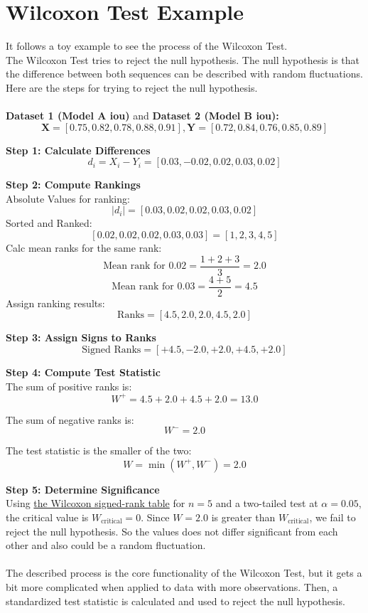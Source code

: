 \chapter{Wilcoxon Test Example}
\label{appendix:wilcoxon-test-example}
	It follows a toy example to see the process of the Wilcoxon Test.\\
	The Wilcoxon Test tries to reject the null hypothesis. The null hypothesis is that the difference between both sequences can be described with random fluctuations. Here are the steps for trying to reject the null hypothesis.\\
	\\
	\textbf{Dataset 1 (Model A \ac{iou})} and \textbf{Dataset 2 (Model B \ac{iou}):}
	\[
	\mathbf{X} = [0.75, 0.82, 0.78, 0.88, 0.91], \mathbf{Y} = [0.72, 0.84, 0.76, 0.85, 0.89]
	\]
	
	\textbf{Step 1: Calculate Differences}
	\[
	d_i = X_i - Y_i = [0.03, -0.02, 0.02, 0.03, 0.02]
	\]
	
	\textbf{Step 2: Compute Rankings}\\
	Absolute Values for ranking:
	\[
	|d_i| = [0.03, 0.02, 0.02, 0.03, 0.02]
	\]
	Sorted and Ranked:
	\[
	[0.02, 0.02, 0.02, 0.03, 0.03] = [1, 2, 3, 4, 5]
	\]
	Calc mean ranks for the same rank:
	\[
	\text{Mean rank for } 0.02 = \frac{1 + 2 + 3}{3} = 2.0
	\]
	\[
	\text{Mean rank for } 0.03 = \frac{4 + 5}{2} = 4.5
	\]
	Assign ranking results:
	\[
	\text{Ranks} = [4.5, 2.0, 2.0, 4.5, 2.0]
	\]
	
	\textbf{Step 3: Assign Signs to Ranks}
	\[
	\text{Signed Ranks} = [+4.5, -2.0, +2.0, +4.5, +2.0]
	\]
	
	\clearpage
	\textbf{Step 4: Compute Test Statistic}\\
	The sum of positive ranks is:
	\[
	W^+ = 4.5 + 2.0 + 4.5 + 2.0 = 13.0
	\]
	
	The sum of negative ranks is:
	\[
	W^- = 2.0
	\]
	
	The test statistic is the smaller of the two:
	\[
	W = \min(W^+, W^-) = 2.0
	\]
	
	\textbf{Step 5: Determine Significance}\\
	Using \href{https://de.wikipedia.org/wiki/Wilcoxon-Vorzeichen-Rang-Test#Teststatistik}{the Wilcoxon signed-rank table} for \( n = 5 \) and a two-tailed test at \( \alpha = 0.05 \), the critical value is \( W_\text{critical} = 0 \). Since \( W = 2.0 \) is greater than \( W_\text{critical} \), we fail to reject the null hypothesis. So the values does not differ significant from each other and also could be a random fluctuation.\\
	\\
	The described process is the core functionality of the Wilcoxon Test, but it gets a bit more complicated when applied to data with more observations. Then, a standardized test statistic is calculated and used to reject the null hypothesis.


